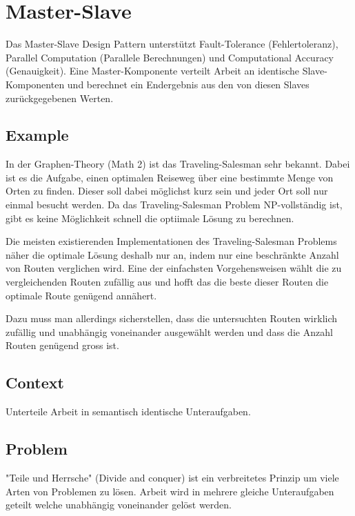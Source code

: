 \section{Master-Slave}


Das Master-Slave Design Pattern unterstützt Fault-Tolerance (Fehlertoleranz), Parallel Computation (Parallele Berechnungen) und Computational Accuracy (Genauigkeit). Eine Master-Komponente verteilt Arbeit an identische Slave-Komponenten und berechnet ein Endergebnis aus den von diesen Slaves zurückgegebenen Werten.

\subsection*{Example}


In der Graphen-Theory (Math 2) ist das Traveling-Salesman sehr bekannt. Dabei ist es die Aufgabe, einen optimalen Reiseweg über eine bestimmte Menge von Orten zu finden. Dieser soll dabei möglichst kurz sein und jeder Ort soll nur einmal besucht werden. Da das Traveling-Salesman Problem NP-vollständig ist, gibt es keine Möglichkeit schnell die optiimale Lösung zu berechnen.

Die meisten existierenden Implementationen des Traveling-Salesman Problems näher die optimale Lösung deshalb nur an, indem nur eine beschränkte Anzahl von Routen verglichen wird. Eine der einfachsten Vorgehensweisen wählt die zu vergleichenden Routen zufällig aus und hofft das die beste dieser Routen die optimale Route genügend annähert.

Dazu muss man allerdings sicherstellen, dass die untersuchten Routen wirklich zufällig und unabhängig voneinander ausgewählt werden und dass die Anzahl Routen genügend gross ist.

\subsection*{Context}


Unterteile Arbeit in semantisch identische Unteraufgaben.

\subsection*{Problem}


"Teile und Herrsche" (Divide and conquer) ist ein verbreitetes Prinzip um viele Arten von Problemen zu lösen. Arbeit wird in mehrere gleiche Unteraufgaben geteilt welche unabhängig voneinander gelöst werden.

